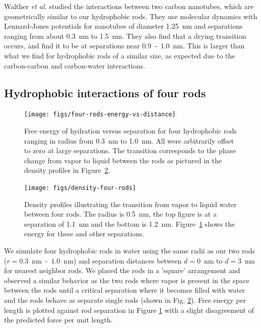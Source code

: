 \documentclass[letterpaper,twocolumn,amsmath,amssymb,prb]{revtex4-1}
\begin{document}
Walther \emph{et al.}\cite{walther2004hydrodynamic} studied the interactions between two
carbon nanotubes, which are geometrically similar to our hydrophobic rods. 
They use molecular dynamics with Lennard-Jones potentials for
nanotubes of diameter 1.25~nm and separations ranging from about 0.3~nm to 1.5~nm.
They also find that a drying transition occurs, and find it to be at separations near
0.9~-~1.0~nm\cite{walther2004hydrodynamic}. This is larger than
what we find for hydrophobic rods of a similar size, as expected due to the carbon-carbon
and carbon-water interactions.

\subsection{Hydrophobic interactions of four rods}

\begin{figure}
\begin{center}
\texttt{[image: figs/four-rods-energy-vs-distance]}
\end{center}
\caption{ Free energy of hydration 
versus separation for four hydrophobic rods ranging in radius from
0.3~nm to 1.0~nm.
All were arbitrarily offset to zero at large separations. The
transition corresponds to the phase change from
vapor to liquid between the rods as pictured in the density profiles in 
Figure~\ref{fig:density-four-rods}. }
\label{fig:four-rods-energy-vs-distance}
\end{figure}

\begin{figure}
\begin{center}
\texttt{[image: figs/density-four-rods]}
\end{center}
\caption{ Density profiles illustrating the transition from vapor 
to liquid water between four rods. The radius is 0.5~nm, the top figure is 
at a separation of 1.1~nm and the
bottom is 1.2~nm. Figure~\ref{fig:four-rods-energy-vs-distance} shows
the energy for these and other separations.}

\label{fig:density-four-rods}
\end{figure}

We simulate four hydrophobic rods in water using the same radii as our
two rods ($r = 0.3$~nm~-~$1.0$~nm) and
separation distances between $d = 0$~nm to $d = 3$~nm for nearest neighbor rods. We placed
the rods in a 'square' arrangement and observed a similar behavior as the two rods
where vapor is present in the space between the rods until a critical separation
where it becomes filled with water and the rods behave as separate single rods
(shown in Fig. \ref{fig:density-four-rods}).  Free energy per length
is plotted against rod separation in Figure
\ref{fig:four-rods-energy-vs-distance} with a slight disagreement of
the predicted force per unit length.
\end{document}
